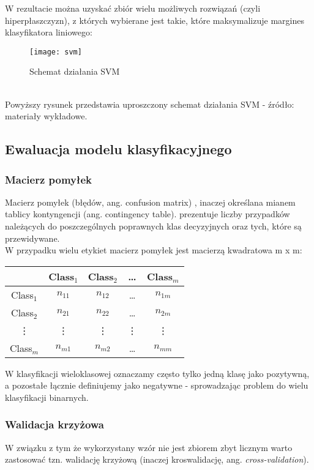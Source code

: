W rezultacie można uzyskać zbiór wielu możliwych rozwiązań (czyli hiperpłaszczyzn), z których wybierane jest takie, które maksymalizuje margines klasyfikatora liniowego:\\
\begin{figure}[h]
    \centering
    \texttt{[image: svm]}
    \caption{Schemat działania SVM}
    \label{fig:svm}
\end{figure}\\
Powyższy rysunek przedstawia uproszczony schemat działania SVM - źródło: materiały wykładowe.

\subsection{Ewaluacja modelu klasyfikacyjnego}
\subsubsection{Macierz pomyłek}
Macierz pomyłek (błędów, ang. confusion matrix) \cite{wyklad}, inaczej określana mianem tablicy kontyngencji (ang. contingency table). prezentuje liczby przypadków należących do poszczególnych poprawnych klas decyzyjnych oraz tych, które są przewidywane.\\

W przypadku wielu etykiet macierz pomyłek jest macierzą kwadratowa m x m:\\

\begin{table}[h!]
    \centering
    \begin{tabular}{|c|c|c|c|c|}
    \hline
     & Class$_1$ & Class$_2$ & \ldots & Class$_m$ \\
    \hline
    Class$_1$ & $n_{11}$ & $n_{12}$ & \ldots & $n_{1m}$ \\
    \hline
    Class$_2$ & $n_{21}$ & $n_{22}$ & \ldots & $n_{2m}$ \\
    \hline
    \vdots & \vdots & \vdots & \vdots & \vdots \\
    \hline
    Class$_m$ & $n_{m1}$ & $n_{m2}$ & \ldots & $n_{mm}$ \\
    \hline
    \end{tabular}
    \end{table}
    
\noindent W klasyfikacji wieloklasowej oznaczamy często tylko jedną klasę jako pozytywną, a pozostałe łącznie definiujemy jako negatywne - sprowadzając problem do wielu klasyfikacji binarnych.

\subsubsection{Walidacja krzyżowa}
W związku z tym że wykorzystany wzór nie jest zbiorem zbyt licznym warto zastosować tzn. walidację krzyżową (inaczej kroswalidację, ang. \textit{cross-validation}).\\


